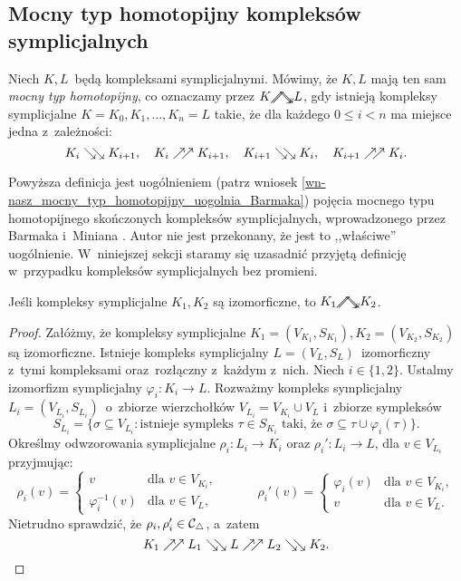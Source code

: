 \subsection{Mocny typ homotopijny kompleksów symplicjalnych}
Niech $K,L$~będą kompleksami symplicjalnymi. Mówimy, że $K,L$ mają ten sam \textit{mocny typ homotopijny}, co oznaczamy przez $K\stronghe L$, gdy istnieją kompleksy symplicjalne $K=K_0,K_1,\ldots,K_n=L$ takie, że dla każdego $0\leq i<n$ ma miejsce jedna z~zależności: \[K_i\dism K_{i+1},\quad K_i\codism K_{i+1},\quad K_{i+1}\dism K_i,\quad K_{i+1}\codism K_i.\]

Powyższa definicja jest uogólnieniem (patrz wniosek \ref{wn-nasz_mocny_typ_homotopijny_uogolnia_Barmaka}) pojęcia mocnego typu homotopijnego skończonych kompleksów symplicjalnych, wprowadzonego przez Barmaka i~Miniana \cite[Definition 2.1]{Barmak12}. Autor nie jest przekonany, że jest to ,,właściwe'' uogólnienie. W~niniejszej sekcji staramy się uzasadnić przyjętą definicję w~przypadku kompleksów symplicjalnych bez promieni. 

\begin{stw}\label{stw-izomorficzne_sa_she}
Jeśli kompleksy symplicjalne $K_1, K_2$ są izomorficzne, to $K_1 \stronghe K_2$.
\end{stw}
\begin{proof}
Załóżmy, że kompleksy symplicjalne $K_1=(V_{K_1},S_{K_1}), K_2=(V_{K_2},S_{K_2})$ są izomorficzne. Istnieje kompleks symplicjalny $L=(V_L,S_L)$~izomorficzny z~tymi kompleksami oraz~rozłączny z~każdym z~nich. Niech $i\in\{1,2\}$. Ustalmy izomorfizm symplicjalny $\varphi_i\colon K_i\to L$. Rozważmy kompleks symplicjalny $L_i=(V_{L_i},S_{L_i})$~o~zbiorze wierzchołków $V_{L_i}=V_{K_i}\cup V_L$ i~zbiorze sympleksów \[S_{L_i}=\{\sigma\subseteq V_{L_i}:\text{istnieje sympleks } \tau\in S_{K_i} \text{ taki, że } \sigma\subseteq \tau\cup\varphi_i(\tau)\}.\]
Określmy odwzorowania symplicjalne $\rho_i\colon L_i\to K_i$ oraz $\rho_i'\colon L_i\to L$, dla $v\in V_{L_i}$ przyjmując:
\[\rho_i(v)=\begin{cases}v & \text{dla } v\in V_{K_i},\\\varphi^{-1}_i(v) & \text{dla } v\in V_{L},\end{cases} \quad\quad\quad \rho_i'(v)=\begin{cases}\varphi_i(v) & \text{dla } v\in V_{K_i},\\v & \text{dla } v\in V_{L}.\end{cases}\]
Nietrudno sprawdzić, że $\rho_i, \rho_i'\in \mathcal{C}_\triangle$, a~zatem \[K_1\codism L_1\dism L\codism L_2\dism K_2.\qedhere\]
\end{proof}

